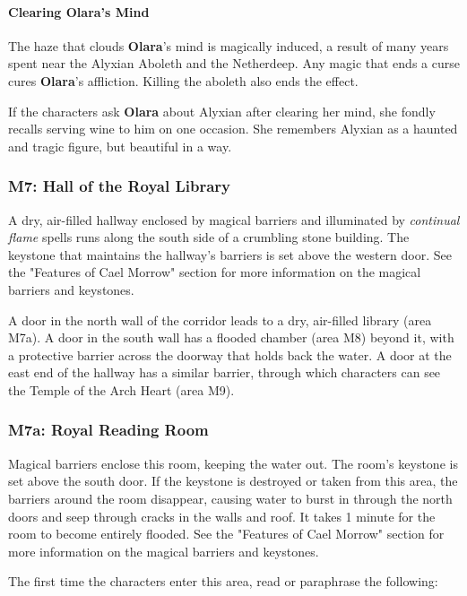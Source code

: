 \documentclass[a4paper, 11pt, bg=full, twocolumn, nooutline]{dndbook}
\begin{document}
\paragraph{Clearing Olara's Mind}

The haze that clouds \textbf{Olara}'s mind is magically induced, a result of many years spent near the Alyxian Aboleth and the Netherdeep. Any magic that ends a curse cures \textbf{Olara}'s affliction. Killing the aboleth also ends the effect.

If the characters ask \textbf{Olara} about Alyxian after clearing her mind, she fondly recalls serving wine to him on one occasion. She remembers Alyxian as a haunted and tragic figure, but beautiful in a way.

\subsubsection{M7: Hall of the Royal Library}

A dry, air-filled hallway enclosed by magical barriers and illuminated by \textit{continual flame} spells runs along the south side of a crumbling stone building. The keystone that maintains the hallway's barriers is set above the western door. See the "Features of Cael Morrow" section for more information on the magical barriers and keystones.

A door in the north wall of the corridor leads to a dry, air-filled library (area M7a). A door in the south wall has a flooded chamber (area M8) beyond it, with a protective barrier across the doorway that holds back the water. A door at the east end of the hallway has a similar barrier, through which characters can see the Temple of the Arch Heart (area M9).

\subsubsection{M7a: Royal Reading Room}

Magical barriers enclose this room, keeping the water out. The room's keystone is set above the south door. If the keystone is destroyed or taken from this area, the barriers around the room disappear, causing water to burst in through the north doors and seep through cracks in the walls and roof. It takes 1 minute for the room to become entirely flooded. See the "Features of Cael Morrow" section for more information on the magical barriers and keystones.

The first time the characters enter this area, read or paraphrase the following:
\end{document}
